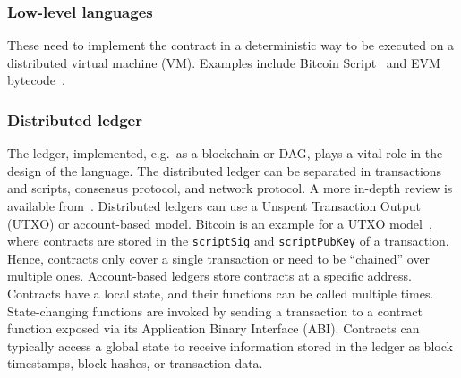 \subsubsection{Low-level languages} These need to implement the contract in a deterministic way to be executed on a distributed virtual machine (VM). Examples include Bitcoin Script~\cite{BitcoinWiki2018Script} and EVM bytecode~\cite{Wood2014}.

\subsubsection{Distributed ledger} The ledger, implemented, e.g.\ as a blockchain or DAG, plays a vital role in the design of the language. 
The distributed ledger can be separated in transactions and scripts, consensus protocol, and network protocol. 
A more in-depth review is available from~\cite{Bonneau2015}.
Distributed ledgers can use a Unspent Transaction Output (UTXO) or account-based model.
Bitcoin is an example for a UTXO model~\cite{Nakamoto2008,Covaci2018}, where contracts are stored in the \texttt{scriptSig} and \texttt{scriptPubKey} of a transaction. 
Hence, contracts only cover a single transaction or need to be ``chained'' over multiple ones.
Account-based ledgers store contracts at a specific address.
Contracts have a local state, and their functions can be called multiple times.
State-changing functions are invoked by sending a transaction to a contract function exposed via its Application Binary Interface (ABI).
Contracts can typically access a global state to receive information stored in the ledger as block timestamps, block hashes, or transaction data. 



